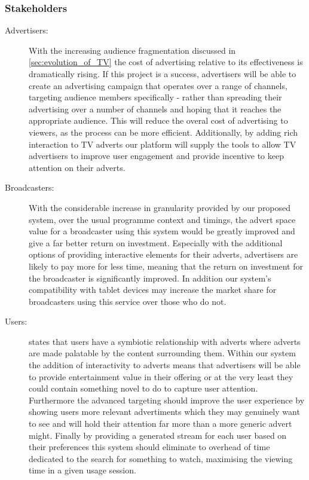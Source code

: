 \subsubsection{Stakeholders}
\begin{description}
\item[Advertisers:]{With the increasing audience fragmentation discussed in \ref{sec:evolution_of_TV} the cost of advertising relative to its effectiveness is dramatically rising. If this project is a success, advertisers will be able to create an advertising campaign that operates over a range of channels, targeting audience members specifically - rather than spreading their advertising over a number of channels and hoping that it reaches the appropriate audience. This will reduce the overal cost of advertising to viewers, as the process can be more efficient. Additionally, by adding rich interaction to TV adverts our platform will supply the tools to allow TV advertisers to improve user engagement and provide incentive to keep attention on their adverts.}
\item[Broadcasters:]{With the considerable increase in granularity provided by our proposed system, over the usual programme context and timings, the advert space value for a broadcaster using this system would be greatly improved and give a far better return on investment. Especially with the additional options of providing interactive elements for their adverts, advertisers are likely to pay more for less time, meaning that the return on investment for the broadcaster is significantly improved. In addition our system's compatibility with tablet devices may increase the market share for broadcasters using this service over those who do not.}
\item[Users:]{\citet{broadcastEconomics} states that users have a symbiotic relationship with adverts where adverts are made palatable by the content surrounding them. Within our system the addition of interactivity to adverts means that advertisers will be able to provide entertainment value in their offering or at the very least they could contain something novel to do to capture user attention. Furthermore the advanced targeting should improve the user experience by showing users more relevant advertiments which they may genuinely want to see and will hold their attention far more than a more generic advert might. Finally by providing a generated stream for each user based on their preferences this system should eliminate to overhead of time dedicated to the search for something to watch, maximising the viewing time in a given usage session.}

\end{description}
